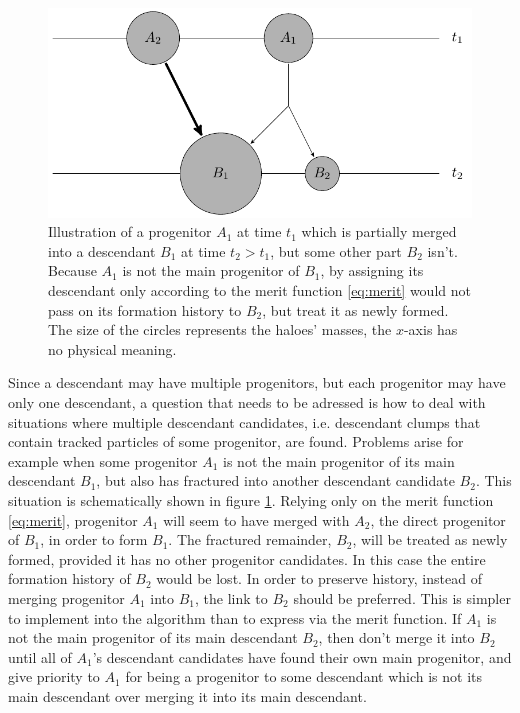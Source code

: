 \begin{figure}[H]
    \centering
    \includegraphics[width=.5\textwidth]{./images/tikz/fracture.pdf}
    \caption{Illustration of a progenitor $A_1$ at time $t_1$ which is partially merged into a descendant $B_1$ at time $t_2 > t_1$, but some other part $B_2$ isn't. 
        Because $A_1$ is not the main progenitor of $B_1$, by assigning its descendant only according to the merit function \eqref{eq:merit} would not pass on its formation history to $B_2$, but treat it as newly formed.
        The size of the circles represents the haloes' masses, the $x$-axis has no physical meaning.
        }
    \label{fig:fracture}
\end{figure}



Since a descendant may have multiple progenitors, but each progenitor may have only one descendant, a question that needs to be adressed is how to deal with situations where multiple descendant candidates, i.e. descendant clumps that contain tracked particles of some progenitor, are found.
Problems arise for example when some progenitor $A_1$ is not the main progenitor of its main descendant $B_1$, but also has fractured into another descendant candidate $B_2$.
This situation is schematically shown in figure \ref{fig:fracture}.
Relying only on the merit function \eqref{eq:merit}, progenitor $A_1$ will seem to have merged with $A_2$, the direct progenitor of $B_1$, in order to form $B_1$.
The fractured remainder, $B_2$, will be treated as newly formed, provided it has no other progenitor candidates.
In this case the entire formation history of $B_2$ would be lost.
In order to preserve history, instead of merging progenitor $A_1$ into $B_1$, the link to $B_2$ should be preferred.
This is simpler to implement into the algorithm than to express via the merit function.
If $A_1$ is not the main progenitor of its main descendant $B_2$, then don't merge it into $B_2$ until all of $A_1$'s descendant candidates have found their own main progenitor, and give priority to $A_1$ for being a progenitor to some descendant which is not its main descendant over merging it into its main descendant.












